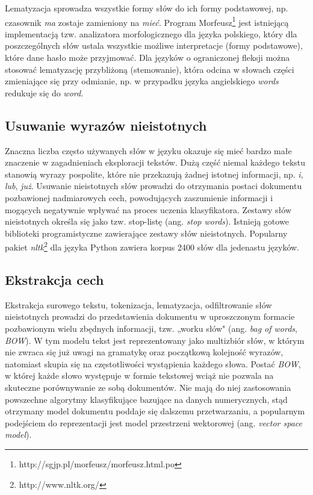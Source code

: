 \documentclass{pracamgr}
\begin{document}
Lematyzacja sprowadza wszystkie formy słów do ich formy podstawowej, np. czasownik \textit{ma} zostaje zamieniony na \textit{mieć}. Program Morfeusz\footnote{http://sgjp.pl/morfeusz/morfeusz.html.po} jest istniejącą implementacją tzw. analizatora morfologicznego dla języka polskiego, który dla poszczególnych słów ustala wszystkie możliwe interpretacje (formy podstawowe), które dane hasło może przyjmować. Dla języków o ograniczonej fleksji można stosować lematyzację przybliżoną (stemowanie), która odcina w słowach części zmieniające się przy odmianie, np. w przypadku języka angielskiego \textit{words} redukuje się do \textit{word}. 

\subsection{Usuwanie wyrazów nieistotnych}

Znaczna liczba często używanych słów w języku okazuje się mieć bardzo małe znaczenie w zagadnieniach eksploracji tekstów. Dużą część niemal każdego tekstu stanowią wyrazy pospolite, które nie przekazują żadnej istotnej informacji, np. \textit{i}, \textit{lub}, \textit{już}. Usuwanie nieistotnych słów prowadzi do otrzymania postaci dokumentu pozbawionej nadmiarowych cech, powodujących zaszumienie informacji i mogących negatywnie wpływać na proces uczenia klasyfikatora. Zestawy słów nieistotnych określa się jako tzw. stop-listę (ang. \textit{stop words}). Istnieją gotowe biblioteki programistyczne zawierające zestawy słów nieistotnych. Popularny pakiet \textit{nltk}\footnote{http://www.nltk.org/} dla języka Python zawiera korpus 2400 słów dla jedenastu języków.

\subsection{Ekstrakcja cech}

Ekstrakcja surowego tekstu, tokenizacja, lematyzacja, odfiltrowanie słów nieistotnych prowadzi do przedstawienia dokumentu w uproszczonym formacie pozbawionym wielu zbędnych informacji, tzw. „worku słów" (ang. \textit{bag of words}, \textit{BOW}). W tym modelu tekst jest reprezentowany jako multizbiór słów, w którym nie zwraca się już uwagi na gramatykę oraz początkową kolejność wyrazów, natomiast skupia się na częstotliwości wystąpienia każdego słowa. Postać \textit{BOW}, w której każde słowo występuje w formie tekstowej wciąż nie pozwala na skuteczne porównywanie ze sobą dokumentów. Nie mają do niej zastosowania powszechne algorytmy klasyfikujące bazujące na danych numerycznych, stąd otrzymany model dokumentu poddaje się dalszemu przetwarzaniu, a popularnym podejściem do reprezentacji jest model przestrzeni wektorowej (ang. \textit{vector space model}).
\end{document}
